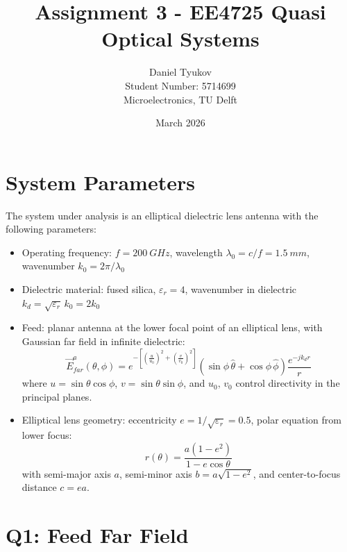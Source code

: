 \documentclass{article}
\title{Assignment 3 - EE4725 Quasi Optical Systems}
\author{Daniel Tyukov \\ Student Number: 5714699 \\ Microelectronics, TU Delft}
\date{March 2026}
\begin{document}
\maketitle

\tableofcontents
\newpage

\section{System Parameters}

The system under analysis is an elliptical dielectric lens antenna with the following parameters:
\begin{itemize}
\item Operating frequency: $f = \SI{200}{GHz}$, wavelength $\lambda_0 = c/f = \SI{1.5}{mm}$, wavenumber $k_0 = 2\pi/\lambda_0$
\item Dielectric material: fused silica, $\varepsilon_r = 4$, wavenumber in dielectric $k_d = \sqrt{\varepsilon_r}\,k_0 = 2k_0$
\item Feed: planar antenna at the lower focal point of an elliptical lens, with Gaussian far field in infinite dielectric:
\begin{equation}\label{eq:feed}
\vec{E}^{a}_{far}(\theta,\phi) = e^{-\left[\left(\frac{u}{u_0}\right)^2 + \left(\frac{v}{v_0}\right)^2\right]} \left(\sin\phi\,\hat{\theta} + \cos\phi\,\hat{\phi}\right) \frac{e^{-jk_d r}}{r}
\end{equation}
where $u = \sin\theta\cos\phi$, $v = \sin\theta\sin\phi$, and $u_0,\,v_0$ control directivity in the principal planes.
\item Elliptical lens geometry: eccentricity $e = 1/\sqrt{\varepsilon_r} = 0.5$, polar equation from lower focus:
\begin{equation}\label{eq:ellipse}
r(\theta) = \frac{a(1-e^2)}{1 - e\cos\theta}
\end{equation}
with semi-major axis $a$, semi-minor axis $b = a\sqrt{1-e^2}$, and center-to-focus distance $c = ea$.
\end{itemize}

\section{Q1: Feed Far Field}
\end{document}
